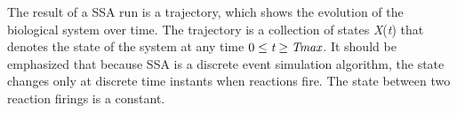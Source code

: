   The result of a SSA run is a trajectory, which shows the evolution of the biological system over time.
  The trajectory is a collection of states \emph{X}(\emph{t}) that denotes the state of the system at any time $0 \leq \emph{t}\geq \emph{Tmax}$.
  It should be emphasized that because SSA is a discrete event simulation algorithm, the state changes only at discrete time instants when reactions fire.
  The state between two reaction firings is a constant.
